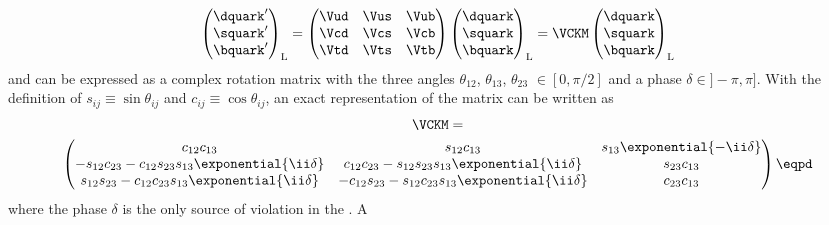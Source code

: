 \begin{equation}
  \begin{pmatrix}
    \dquark^\prime \\
    \squark^\prime \\
    \bquark^\prime \\
  \end{pmatrix}_{\text{L}}
  = 
  \begin{pmatrix}
    \Vud & \Vus & \Vub \\
    \Vcd & \Vcs & \Vcb \\
    \Vtd & \Vts & \Vtb \\
  \end{pmatrix}
  \begin{pmatrix}
    \dquark \\
    \squark \\
    \bquark \\
  \end{pmatrix}_{\text{L}}
  = \VCKM
  \begin{pmatrix}
    \dquark \\
    \squark \\
    \bquark \\
  \end{pmatrix}_{\text{L}}
\end{equation}
%
and can be expressed as a complex rotation matrix with the three angles
$\theta_{12}$, $\theta_{13}$, $\theta_{23}$ $\in {[0, \pi/2]}$ and a phase
$\delta \in {]}-\pi, \pi{]}$. With the definition of $s_{ij} \equiv \sin
\theta_{ij}$ and $c_{ij} \equiv \cos \theta_{ij}$, an exact representation
\cite{Chau:1984fp} of the \CKM matrix can be written as
%
\begin{multline}
  \VCKM = \\
  \begin{pmatrix}
    c_{12} c_{13}                                                   & s_{12} c_{13}                                                 & s_{13} \exponential{-\ii\delta} \\
    -s_{12} c_{23} - c_{12} s_{23} s_{13} \exponential{\ii\delta}   & c_{12} c_{23} - s_{12} s_{23} s_{13} \exponential{\ii\delta}  & s_{23} c_{13}                   \\
    s_{12} s_{23} - c_{12} c_{23} s_{13} \exponential{\ii\delta}    & -c_{12} s_{23} - s_{12} c_{23} s_{13} \exponential{\ii\delta} & c_{23} c_{13}                   \\
  \end{pmatrix}\eqpd
\end{multline}
%
where the phase $\delta$ is the only source of \CP violation in the \SM. A
